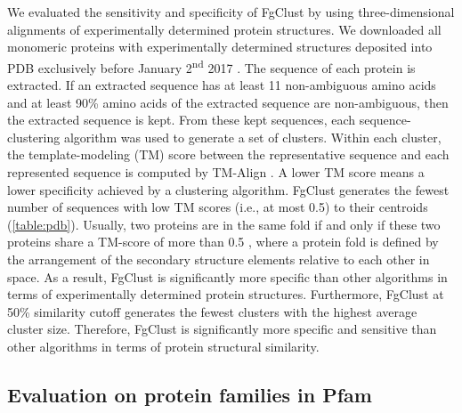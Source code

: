 \documentclass{bioinfo}
\begin{document}
We evaluated the sensitivity and specificity of FgClust by using three-dimensional alignments of experimentally determined protein structures.
We downloaded all monomeric proteins with experimentally determined structures deposited into PDB exclusively before January 2\textsuperscript{nd} 2017 \citep{berman2006protein}.
The sequence of each protein is extracted.
If an extracted sequence has at least 11 non-ambiguous amino acids and at least 90\% amino acids of the extracted sequence are non-ambiguous, then the extracted sequence is kept.
From these kept sequences, each sequence-clustering algorithm was used to generate a set of clusters.
Within each cluster, the template-modeling (TM) score between the representative sequence and each represented sequence is computed by TM-Align \citep{zhang2005tm}.
A lower TM score means a lower specificity achieved by a clustering algorithm.
FgClust generates the fewest number of sequences with low TM scores (i.e., at most 0.5) to their centroids (\cref{table:pdb}).
Usually, two proteins are in the same fold if and only if these two proteins share a TM-score of more than 0.5 \citep{xu2010significant}, where a protein fold is defined by the arrangement of the secondary structure elements relative to each other in space.
As a result, FgClust is significantly more specific than other algorithms in terms of experimentally determined protein structures.
Furthermore, FgClust at 50\% similarity cutoff generates the fewest clusters with the highest average cluster size.
Therefore, FgClust is significantly more specific and sensitive than other algorithms in terms of protein structural similarity.

\subsection{Evaluation on protein families in Pfam}
\end{document}
